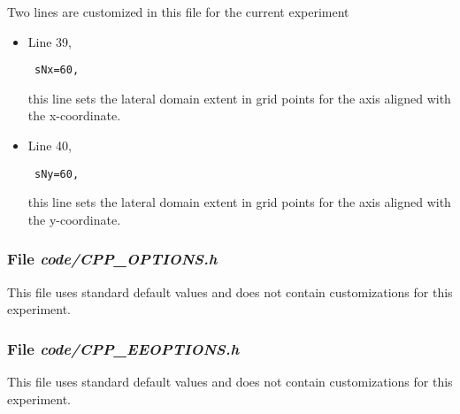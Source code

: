 Two lines are customized in this file for the current experiment

\begin{itemize}

\item Line 39, 
\begin{verbatim} sNx=60, \end{verbatim} this line sets
the lateral domain extent in grid points for the
axis aligned with the x-coordinate.

\item Line 40, 
\begin{verbatim} sNy=60, \end{verbatim} this line sets
the lateral domain extent in grid points for the
axis aligned with the y-coordinate.

\end{itemize}

\begin{small}

\end{small}

\subsubsection{File {\it code/CPP\_OPTIONS.h}}
\label{www:tutorials}

This file uses standard default values and does not contain
customizations for this experiment.


\subsubsection{File {\it code/CPP\_EEOPTIONS.h}}
\label{www:tutorials}

This file uses standard default values and does not contain
customizations for this experiment.

